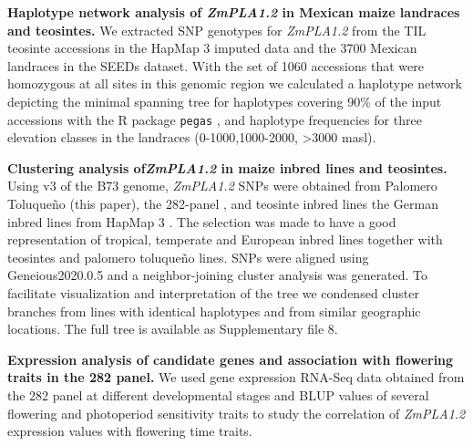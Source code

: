 \documentclass[9pt,twocolumn,twoside,lineno]{BioRxiv}
\def\code#1{\texttt{#1}}
\begin{document}
\textbf{Haplotype network analysis of \textit{ZmPLA1.2} in Mexican maize landraces and teosintes.}
We extracted SNP genotypes for \textit{ZmPLA1.2} from the TIL teosinte accessions in the HapMap 3 imputed data \cite{Bukowski2017-ng} and the 3700 Mexican landraces in the SEEDs dataset. 
With the set of 1060 accessions that were homozygous at all sites in this genomic region we calculated a haplotype network depicting the minimal spanning tree for haplotypes covering 90\% of the input accessions with the R package \code{pegas} \cite{paradis2010}, and haplotype frequencies for three elevation classes in the landraces (0-1000,1000-2000, >3000 masl).

\textbf{Clustering analysis of\textit{ZmPLA1.2} in maize inbred lines and teosintes.}
Using v3 of the B73 genome, \textit{ZmPLA1.2} SNPs were obtained from Palomero Toluqueño (this paper), the 282-panel \cite{Flint-Garcia2005-hb},  and teosinte inbred lines the German inbred lines from HapMap 3 \cite{Bukowski2017-ng}. 
The selection was made to have a good representation of tropical, temperate and European inbred lines together with teosintes and palomero toluqueño lines.
SNPs were aligned using Geneious2020.0.5 and a neighbor-joining cluster analysis was generated. 
To facilitate visualization and interpretation of the tree we condensed cluster branches from lines with identical haplotypes and from similar geographic locations. 
The full tree is available as Supplementary file 8. 

\textbf{Expression analysis of candidate genes and association with flowering traits in the 282 panel.}
We used gene expression RNA-Seq data obtained from the 282 panel at different developmental stages \cite{Kremling2018-gn} and BLUP values of several flowering and photoperiod sensitivity traits \cite{Hung2012-ms} to study the correlation of \textit{ZmPLA1.2} expression values with flowering time traits.  
\end{document}
